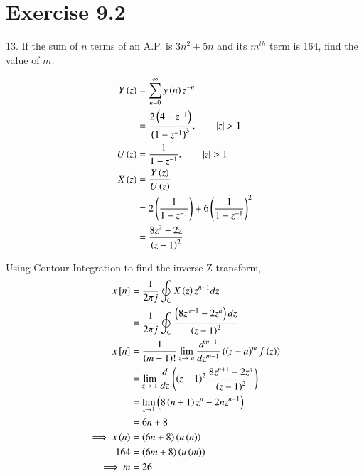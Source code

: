 \documentclass[journal,12pt,twocolumn]{IEEEtran}
\begin{document}


\vspace{3cm}

\title{}
\author{EE23BTECH11054 -  Sai Krishna Shanigarapu$^{*}$
}
\maketitle
\newpage
\bigskip


\section*{Exercise 9.2}

13. \hspace{2pt}If the sum of $n$ terms of an A.P. is $3n^2+5n$ and its $m^{th}$ term is 164, find the value of $m$.
\bigskip

\solution

\begin{align}
Y\brak{z} &=  \sum_{n=0}^{\infty} y\brak{n}z^{-n} \\
&= \frac{2\brak{4-z^{-1}}}{\brak{1-z^{-1}}^3}, \qquad |z| > 1\\
U\brak{z} &= \frac{1}{1-z^{-1}}, \qquad |z| > 1\\
X\brak{z} &=  \frac{Y\brak{z}}{U\brak{z}}\\
 &= 2\left(\frac{1}{1-z^{-1}}\right) + 6\left(\frac{1}{1-z^{-1}}\right) ^2 \\
 &= \frac{8z^2 - 2z}{\brak{z-1}^2} %
\end{align}


Using Contour Integration to find the inverse Z-transform,
\begin{align}
    x{}\left[n\right] &= \frac{1}{2\pi j}\oint_C X\left(z\right)z^{n-1}dz\\
    &= \frac{1}{2\pi j}\oint_C \frac{\left(8z^{n+1} - 2z^{n}\right)dz}{\left(z-1\right)^2}\\
    x{}\left[n\right] &= \frac{1}{\left(m-1\right)!}\lim_{z\to\ a}\frac{d^{m-1}}{dz^{m-1}}\left(\left(z-a\right)^m f\left(z\right)\right)\\
    &= \lim_{z\to\ 1}\frac{d}{dz}\left(\left(z-1\right)^2 \frac{8z^{n+1} - 2z^n}{\left(z-1\right)^2}\right)\\
    &= \lim_{z\to 1}\left(8\left(n+1\right)z^n - 2nz^{n-1}\right)\\
    &= 6n+8\\
    \implies x\left(n\right) &= \left(6n+8\right)\left(u\left(n\right)\right)\\
    164 &= \left(6m+8\right)\left(u\left(m\right)\right)\\
    \implies m &= 26
\end{align}
\end{document}
